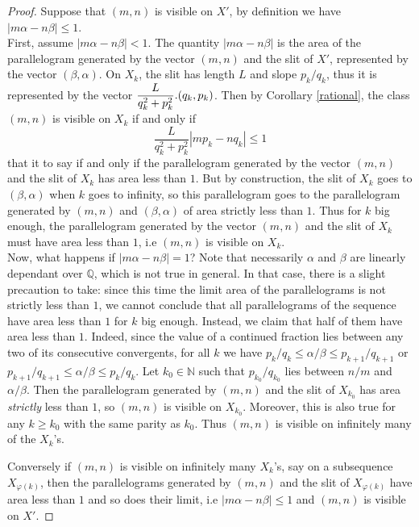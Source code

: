 \documentclass{article}
\newcommand{\NN}{\mathbb{N}}
\newcommand{\QQ}{\mathbb{Q}}
\theoremstyle{definition}
\begin{document}
\begin{proof}
    Suppose that $(m,n)$ is visible on $X'$, by definition we have $|m\alpha - n\beta| \le 1$. \\ First, assume $|m\alpha - n\beta| < 1$. The quantity $|m\alpha - n\beta|$ is the area of the parallelogram generated by the vector $(m,n)$ and the slit of $X'$, represented by the vector $(\beta,\alpha)$. On $X_k$, the slit has length $L$ and slope $p_k/q_k$, thus it is represented by the vector $\mathlarger{\frac{L}{q_k^2+p_k^2}}.(q_k,p_k)$. Then by Corollary \ref{rational}, the class $(m,n)$ is visible on $X_k$ if and only if 
    $$ \frac{L}{q_k^2+p_k^2} |m p_k - nq_k| \le 1$$
    that it to say if and only if the parallelogram generated by the vector $(m,n)$ and the slit of $X_k$ has area less than $1$. But by construction, the slit of $X_k$ goes to $(\beta, \alpha)$ when $k$ goes to infinity, so this parallelogram goes to the parallelogram generated by $(m,n)$ and $(\beta, \alpha)$ of area strictly less than $1$. Thus for $k$ big enough, the parallelogram generated by the vector $(m,n)$ and the slit of $X_k$ must have area less than $1$, i.e $(m,n)$ is visible on $X_k$. \\
    Now, what happens if $|m\alpha - n\beta| = 1$? Note that necessarily $\alpha$ and $\beta$ are linearly dependant over $\QQ$, which is not true in general. In that case, there is a slight precaution to take: since this time the limit area of the parallelograms is not strictly less than $1$, we cannot conclude that all parallelograms of the sequence have area less than $1$ for $k$ big enough. Instead, we claim that half of them have area less than $1$. Indeed, since the value of a continued fraction lies between any two of its consecutive convergents, for all $k$ we have $p_k/q_k \le \alpha /\beta \le p_{k+1}/q_{k+1}$ or $ p_{k+1}/q_{k+1} \le \alpha /\beta \le p_k/q_k$. Let $k_0\in \NN$ such that $p_{k_0}/q_{k_0}$ lies between $n/m$ and $\alpha/\beta$. Then the parallelogram generated by $(m,n)$ and the slit of $X_{k_0}$ has area \emph{strictly} less than $1$, so $(m,n)$ is visible on $X_{k_0}$. Moreover, this is also true for any $k\ge k_0$ with the same parity as $k_0$. Thus $(m,n)$ is visible on infinitely many of the $X_k$'s. \newline

    Conversely if $(m,n)$ is visible on infinitely many $X_k$'s, say on a subsequence $X_{\varphi(k)}$, then the parallelograms generated by $(m,n)$ and the slit of $X_{\varphi(k)}$ have area less than $1$ and so does their limit, i.e $|m\alpha - n\beta| \le 1$ and $(m,n)$ is visible on $X'$.
\end{proof}
\end{document}
